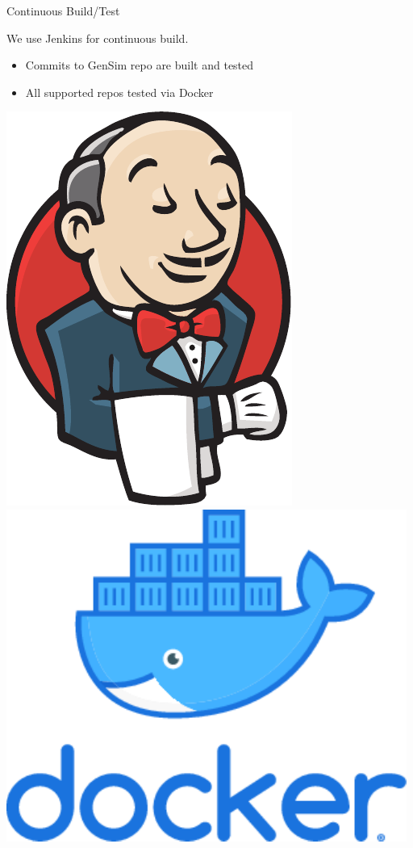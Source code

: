 \begin{frame}{Continuous Build/Test}

We use Jenkins for continuous build.
\begin{itemize}
\item Commits to GenSim repo are built and tested
\item All supported repos tested via Docker
\end{itemize}

\bigskip
\bigskip

\centering
\includegraphics[height=0.25\textheight]{figures/jenkins}
\qquad\qquad
\includegraphics[height=0.25\textheight] {figures/docker}


\end{frame}

